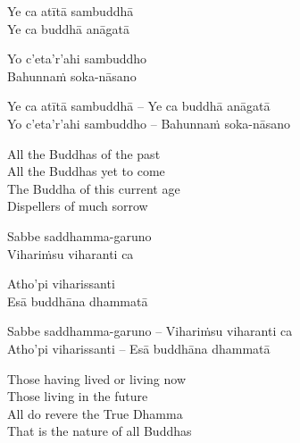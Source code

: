 \ifninebythirteen

\begin{pali-hang-verses}
  Ye ca atītā sambuddhā\\
  Ye ca buddhā anāgatā
\end{pali-hang-verses}
\begin{pali-hang-together}
  Yo c'eta'r'ahi sambuddho\\
  Bahunnaṁ soka-nāsano
\end{pali-hang-together}

\else

\begin{verses}
  Ye ca atītā sambuddhā – Ye ca buddhā anāgatā\\
  Yo c'eta'r'ahi sambuddho – Bahunnaṁ soka-nāsano
\end{verses}

\fi

\begin{english-verses}
  All the Buddhas of the past\\
  All the Buddhas yet to come\\
  The Buddha of this current age\\
  Dispellers of much sorrow
\end{english-verses}

\ifninebythirteen

\begin{pali-hang-verses}
  Sabbe saddhamma-garuno\\
  Vihariṁsu viharanti ca
\end{pali-hang-verses}
\begin{pali-hang-together}
  Atho'pi viharissanti\\
  Esā buddhāna dhammatā
\end{pali-hang-together}

\else

\begin{verses}
  Sabbe saddhamma-garuno – Vihariṁsu viharanti ca\\
  Atho'pi viharissanti – Esā buddhāna dhammatā
\end{verses}

\fi

\begin{english-verses}
  Those having lived or living now\\
  Those living in the future\\
  All do revere the True Dhamma\\
  That is the nature of all Buddhas
\end{english-verses}

